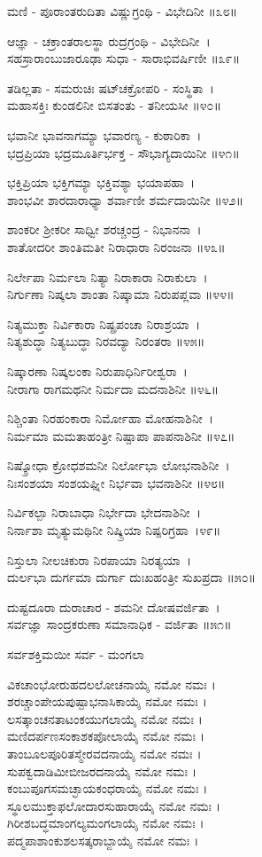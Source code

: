 ಮಣಿ - ಪೂರಾಂತರುದಿತಾ ವಿಷ್ಣುಗ್ರಂಥಿ - ವಿಭೇದಿನೀ ॥೩೮॥

ಆಜ್ಞಾ - ಚಕ್ರಾಂತರಾಲಸ್ಥಾ ರುದ್ರಗ್ರಂಥಿ - ವಿಭೇದಿನೀ~।\\
ಸಹಸ್ರಾರಾಂಬುಜಾರೂಢಾ ಸುಧಾ - ಸಾರಾಭಿವರ್ಷಿಣೀ ॥೩೯॥

ತಡಿಲ್ಲತಾ - ಸಮರುಚಿಃ ಷಟ್‍ಚಕ್ರೋಪರಿ - ಸಂಸ್ಥಿತಾ~।\\
ಮಹಾಸಕ್ತಿಃ ಕುಂಡಲಿನೀ ಬಿಸತಂತು - ತನೀಯಸೀ ॥೪೦॥

ಭವಾನೀ ಭಾವನಾಗಮ್ಯಾ ಭವಾರಣ್ಯ - ಕುಠಾರಿಕಾ~।\\
ಭದ್ರಪ್ರಿಯಾ ಭದ್ರಮೂರ್ತಿರ್ಭಕ್ತ - ಸೌಭಾಗ್ಯದಾಯಿನೀ ॥೪೧॥

ಭಕ್ತಿಪ್ರಿಯಾ ಭಕ್ತಿಗಮ್ಯಾ ಭಕ್ತಿವಶ್ಯಾ ಭಯಾಪಹಾ~।\\
ಶಾಂಭವೀ ಶಾರದಾರಾಧ್ಯಾ ಶರ್ವಾಣೀ ಶರ್ಮದಾಯಿನೀ ॥೪೨॥

ಶಾಂಕರೀ ಶ್ರೀಕರೀ ಸಾಧ್ವೀ ಶರಚ್ಚಂದ್ರ - ನಿಭಾನನಾ~।\\
ಶಾತೋದರೀ ಶಾಂತಿಮತೀ ನಿರಾಧಾರಾ ನಿರಂಜನಾ ॥೪೩॥

ನಿರ್ಲೇಪಾ ನಿರ್ಮಲಾ ನಿತ್ಯಾ ನಿರಾಕಾರಾ ನಿರಾಕುಲಾ~।\\
ನಿರ್ಗುಣಾ ನಿಷ್ಕಲಾ ಶಾಂತಾ ನಿಷ್ಕಾಮಾ ನಿರುಪಪ್ಲವಾ ॥೪೪॥

ನಿತ್ಯಮುಕ್ತಾ ನಿರ್ವಿಕಾರಾ ನಿಷ್ಪ್ರಪಂಚಾ ನಿರಾಶ್ರಯಾ~।\\
ನಿತ್ಯಶುದ್ಧಾ ನಿತ್ಯಬುದ್ಧಾ ನಿರವದ್ಯಾ ನಿರಂತರಾ ॥೪೫॥

ನಿಷ್ಕಾರಣಾ ನಿಷ್ಕಲಂಕಾ ನಿರುಪಾಧಿರ್ನಿರೀಶ್ವರಾ~।\\
ನೀರಾಗಾ ರಾಗಮಥನೀ ನಿರ್ಮದಾ ಮದನಾಶಿನೀ ॥೪೬॥

ನಿಶ್ಚಿಂತಾ ನಿರಹಂಕಾರಾ ನಿರ್ಮೋಹಾ ಮೋಹನಾಶಿನೀ~।\\
ನಿರ್ಮಮಾ ಮಮತಾಹಂತ್ರೀ ನಿಷ್ಪಾಪಾ ಪಾಪನಾಶಿನೀ ॥೪೭॥

ನಿಷ್ಕ್ರೋಧಾ ಕ್ರೋಧಶಮನೀ ನಿರ್ಲೋಭಾ ಲೋಭನಾಶಿನೀ~।\\
ನಿಃಸಂಶಯಾ ಸಂಶಯಘ್ನೀ ನಿರ್ಭವಾ ಭವನಾಶಿನೀ ॥೪೮॥

ನಿರ್ವಿಕಲ್ಪಾ ನಿರಾಬಾಧಾ ನಿರ್ಭೇದಾ ಭೇದನಾಶಿನೀ~।\\
ನಿರ್ನಾಶಾ ಮೃತ್ಯುಮಥಿನೀ ನಿಷ್ಕ್ರಿಯಾ ನಿಷ್ಪರಿಗ್ರಹಾ~।೪೯॥

ನಿಸ್ತುಲಾ ನೀಲಚಿಕುರಾ ನಿರಪಾಯಾ ನಿರತ್ಯಯಾ~।\\
ದುರ್ಲಭಾ ದುರ್ಗಮಾ ದುರ್ಗಾ ದುಃಖಹಂತ್ರೀ ಸುಖಪ್ರದಾ ॥೫೦॥

ದುಷ್ಟದೂರಾ ದುರಾಚಾರ - ಶಮನೀ ದೋಷವರ್ಜಿತಾ~।\\
ಸರ್ವಜ್ಞಾ ಸಾಂದ್ರಕರುಣಾ ಸಮಾನಾಧಿಕ - ವರ್ಜಿತಾ ॥೫೧॥

ಸರ್ವಶಕ್ತಿಮಯೀ ಸರ್ವ - ಮಂಗಲಾ 

ವಿಕಚಾಂಭೋರುಹದಲಲೋಚನಾಯೈ ನಮೋ ನಮಃ ।\\
ಶರಚ್ಚಾಂಪೇಯಪುಷ್ಪಾಭನಾಸಿಕಾಯೈ ನಮೋ ನಮಃ ।\\
ಲಸತ್ಕಾಂಚನತಾಟಂಕಯುಗಲಾಯೈ ನಮೋ ನಮಃ ।\\
ಮಣಿದರ್ಪಣಸಂಕಾಶಕಪೋಲಾಯೈ ನಮೋ ನಮಃ ।\\
ತಾಂಬೂಲಪೂರಿತಸ್ಮೇರವದನಾಯೈ ನಮೋ ನಮಃ ।\\
ಸುಪಕ್ವದಾಡಿಮೀಬೀಜರದನಾಯೈ ನಮೋ ನಮಃ ।\\
ಕಂಬುಪೂಗಸಮಚ್ಛಾಯಕಂಧರಾಯೈ ನಮೋ ನಮಃ ।\\
ಸ್ಥೂಲಮುಕ್ತಾಫಲೋದಾರಸುಹಾರಾಯೈ ನಮೋ ನಮಃ ।\\
ಗಿರೀಶಬದ್ಧಮಾಂಗಲ್ಯಮಂಗಲಾಯೈ ನಮೋ ನಮಃ ।\\
ಪದ್ಮಪಾಶಾಂಕುಶಲಸತ್ಕರಾಬ್ಜಾಯೈ ನಮೋ ನಮಃ ।	

